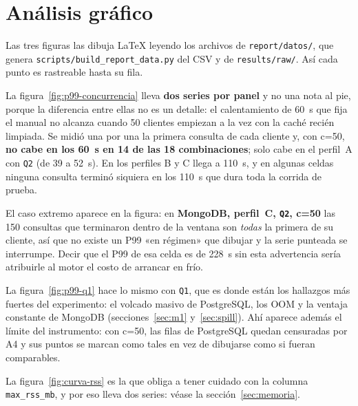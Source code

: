 
\section{Análisis gráfico}
\label{sec:graficas}

Las tres figuras las dibuja LaTeX leyendo los archivos de
\texttt{report/datos/}, que genera \texttt{scripts/build\_report\_data.py} del
CSV y de \texttt{results/raw/}. Así cada punto es rastreable hasta su fila.



La figura~\ref{fig:p99-concurrencia} lleva \textbf{dos series por panel} y no una
nota al pie, porque la diferencia entre ellas no es un detalle: el calentamiento
de 60~s que fija el manual no alcanza cuando 50 clientes empiezan a la vez con la
caché recién limpiada. Se midió una por una la primera consulta de cada cliente
y, con \mbox{c=50}, \textbf{no cabe en los 60~s en 14 de las 18 combinaciones};
solo cabe en el perfil~A con \texttt{Q2} (de 39 a 52~s). En los perfiles B y C
llega a 110~s, y en algunas celdas ninguna consulta terminó siquiera en los 110~s
que dura toda la corrida de prueba.

El caso extremo aparece en la figura: en \textbf{MongoDB, perfil~C,
\texttt{Q2}, \mbox{c=50}} las \num{150} consultas que terminaron dentro de la
ventana son \emph{todas} la primera de su cliente, así que no existe un P99 «en
régimen» que dibujar y la serie punteada se interrumpe. Decir que el P99 de esa
celda es de 228~s sin esta advertencia sería atribuirle al motor el costo de
arrancar en frío.



La figura~\ref{fig:p99-q1} hace lo mismo con \texttt{Q1}, que es donde están los
hallazgos más fuertes del experimento: el volcado masivo de PostgreSQL, los OOM y
la ventaja constante de MongoDB (secciones~\ref{sec:m1} y~\ref{sec:spill}). Ahí
aparece además el límite del instrumento: con \mbox{c=50}, las filas de PostgreSQL
quedan censuradas por A4 y sus puntos se marcan como tales en vez de dibujarse como
si fueran comparables.





La figura~\ref{fig:curva-rss} es la que obliga a tener cuidado con la columna
\texttt{max\_rss\_mb}, y por eso lleva dos series: véase la
sección~\ref{sec:memoria}.
